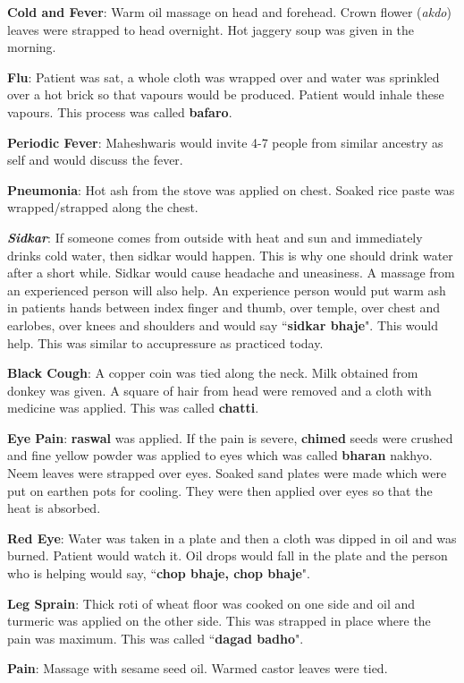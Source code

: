 \textbf{Cold and Fever}: Warm oil massage on head and forehead. Crown flower
(\textit{akdo}) leaves were strapped to head overnight. Hot jaggery soup was
given in the morning.

\textbf{Flu}: Patient was sat, a whole cloth was wrapped over and water was
sprinkled over a hot brick so that vapours would be produced. Patient would
inhale these vapours. This process was called \textbf{bafaro}.

\textbf{Periodic Fever}: Maheshwaris would invite 4-7 people from similar
ancestry as self and would discuss the fever.

\textbf{Pneumonia}: Hot ash from the stove was applied on chest. Soaked rice
paste was wrapped/strapped along the chest.

\textbf{\textit{Sidkar}}: If someone comes from outside with heat and sun and
immediately drinks cold water, then sidkar would happen. This is why one should
drink water after a short while. Sidkar would cause headache and uneasiness. A
massage from an experienced person will also help. An experience person would
put warm ash in patients hands between index finger and thumb, over temple,
over chest and earlobes, over knees and shoulders and would say
``\textbf{sidkar bhaje}". This would help. This was similar to accupressure as
practiced today.

\textbf{Black Cough}: A copper coin was tied along the neck. Milk obtained from
donkey was given. A square of hair from head were removed and a cloth with
medicine was applied. This was called \textbf{chatti}.

\textbf{Eye Pain}: \textbf{raswal} was applied. If the pain is severe,
\textbf{chimed} seeds were crushed and fine yellow powder was applied to eyes
which was called \textbf{bharan} nakhyo. Neem leaves were strapped over eyes.
Soaked sand plates were made which were put on earthen pots for cooling. They
were then applied over eyes so that the heat is absorbed. 

\textbf{Red Eye}: Water was taken in a plate and then a cloth was dipped in oil
and was burned. Patient would watch it. Oil drops would fall in the plate and
the person who is helping would say, ``\textbf{chop bhaje, chop bhaje}". 

\textbf{Leg Sprain}: Thick roti of wheat floor was cooked on one side and oil
and turmeric was applied on the other side. This was strapped in place where
the pain was maximum. This was called ``\textbf{dagad badho}".

\textbf{Pain}: Massage with sesame seed oil. Warmed castor leaves were tied.

